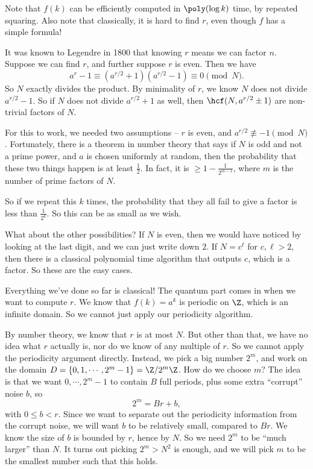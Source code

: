 \documentclass[a4paper]{article}
\begin{document}
Note that $f(k)$ can be efficiently computed in $\poly(\log k)$ time, by repeated squaring. Also note that classically, it is hard to find $r$, even though $f$ has a simple formula!

It was known to Legendre in 1800 that knowing $r$ means we can factor $n$. Suppose we can find $r$, and further suppose $r$ is even. Then we have
\[
  a^r - 1 \equiv (a^{r/2} + 1)(a^{r/2} - 1) \equiv 0 \pmod N.
\]
So $N$ exactly divides the product. By minimality of $r$, we know $N$ does not divide $a^{r/2} - 1$. So if $N$ does not divide $a^{r/2} + 1$ as well, then $\hcf(N, a^{r/2} \pm 1)$ are non-trivial factors of $N$.

For this to work, we needed two assumptions -- $r$ is even, and $a^{r/2} \not\equiv -1 \pmod N$. Fortunately, there is a theorem in number theory that says if $N$ is odd and not a prime power, and $a$ is chosen uniformly at random, then the probability that these two things happen is at least $\frac{1}{2}$. In fact, it is $\geq 1 - \frac{1}{2^{m - 1}}$, where $m$ is the number of prime factors of $N$.

So if we repeat this $k$ times, the probability that they all fail to give a factor is less than $\frac{1}{2^k}$. So this can be as small as we wish.

What about the other possibilities? If $N$ is even, then we would have noticed by looking at the last digit, and we can just write down $2$. If $N = c^\ell$ for $c, \ell > 2$, then there is a classical polynomial time algorithm that outputs $c$, which is a factor. So these are the easy cases.

Everything we've done so far is classical! The quantum part comes in when we want to compute $r$. We know that $f(k) = a^k$ is periodic on $\Z$, which is an infinite domain. So we cannot just apply our periodicity algorithm.

By number theory, we know that $r$ is at most $N$. But other than that, we have no idea what $r$ actually is, nor do we know of any multiple of $r$. So we cannot apply the periodicity argument directly. Instead, we pick a big number $2^m$, and work on the domain $D = \{0, 1, \cdots, 2^m - 1\} = \Z/2^m \Z$. How do we choose $m$? The idea is that we want $0, \cdots, 2^m - 1$ to contain $B$ full periods, plus some extra ``corrupt'' noise $b$, so
\[
  2^m = Br + b,
\]
with $0 \leq b < r$. Since we want to separate out the periodicity information from the corrupt noise, we will want $b$ to be relatively small, compared to $Br$. We know the size of $b$ is bounded by $r$, hence by $N$. So we need $2^m$ to be ``much larger'' than $N$. It turns out picking $2^m > N^2$ is enough, and we will pick $m$ to be the smallest number such that this holds.
\end{document}
